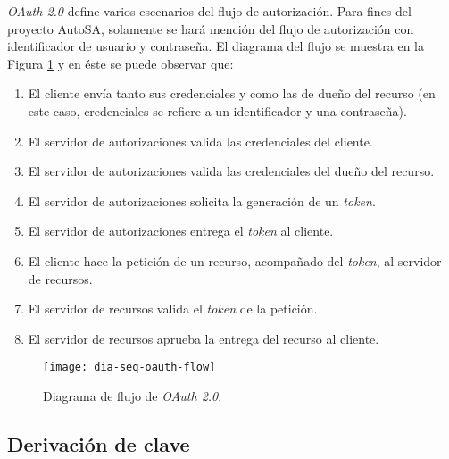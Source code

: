 \textit{OAuth 2.0} define varios escenarios del flujo de autorización. Para fines del proyecto AutoSA, solamente se hará mención del flujo de autorización con identificador de usuario y contraseña\cite{OAuthRFC, OAuth2Identity}. El diagrama del flujo se muestra en la Figura \ref{fig:dia-seq-oauth-flow} y en éste se puede observar que:
\begin{enumerate}
	\item El cliente envía tanto sus credenciales y como las de dueño del recurso (en este caso, credenciales se refiere a un identificador y una contraseña).
	\item El servidor de autorizaciones valida las credenciales del cliente.
	\item El servidor de autorizaciones valida las credenciales del dueño del recurso.
	\item El servidor de autorizaciones solicita la generación de un \textit{token}.
	\item El servidor de autorizaciones entrega el \textit{token} al cliente.
	\item El cliente hace la petición de un recurso, acompañado del \textit{token}, al servidor de recursos.
	\item El servidor de recursos valida el \textit{token} de la petición. 
	\item El servidor de recursos aprueba la entrega del recurso al cliente.
\end{enumerate}

\begin{figure}[h]
	\centering
	\texttt{[image: dia-seq-oauth-flow]}
	\caption{Diagrama de flujo de \textit{OAuth 2.0}.}
	\label{fig:dia-seq-oauth-flow}
\end{figure}

\subsection{Derivación de clave}\label{sec:key-derivation}

